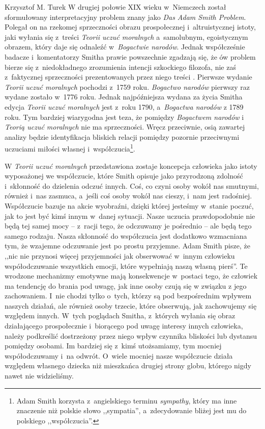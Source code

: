 \begin{artplenv}{Krzysztof M. Turek}
W drugiej połowie XIX wieku w~Niemczech został sformułowany interpretacyjny problem znany jako \textit{Das Adam Smith
Problem}. Polegał on na rzekomej sprzeczności obrazu prospołecznej i~altruistycznej istoty, jaki wyłania się z~treści
\textit{Teorii uczuć moralnych} a~samolubnym, egoistycznym obrazem, który daje się odnaleźć w~\textit{Bogactwie narodów}.
Jednak współcześnie badacze i~komentatorzy Smitha prawie powszechnie zgadzają się, że ów problem bierze
się z~niedokładnego zrozumienia intencji szkockiego filozofa, nie zaś z~faktycznej sprzeczności prezentowanych przez niego
treści
\parencite{wilson_adam_2006}.
Pierwsze wydanie \textit{Teorii uczuć moralnych} pochodzi z~1759
roku. \textit{Bogactwo narodów} pierwszy raz wydane zostało w~1776 roku. Jednak
najpóźniejsza wydana za życia Smitha edycja \textit{Teorii uczuć moralnych} jest z~roku 1790, a~\textit{Bogactwa narodów} z 1789 roku. Tym
bardziej wiarygodna jest teza, że pomiędzy \textit{Bogactwem narodów} i \textit{Teorią uczuć moralnych} nie ma sprzeczności. Wręcz przeciwnie,
osią zawartej analizy będzie identyfikacja bliskich relacji pomiędzy pozornie przeciwnymi uczuciami miłości
własnej i~współczucia\footnote{Adam Smith korzysta z~angielskiego terminu \textit{sympathy},
który ma inne znaczenie niż polskie
słowo ,,sympatia'', a~zdecydowanie bliżej jest mu do polskiego ,,współczucia''.}.

W \textit{Teorii uczuć moralnych} przedstawiona zostaje koncepcja człowieka jako istoty wyposażonej we współczucie,
które Smith opisuje jako przyrodzoną zdolność i~skłonność do dzielenia odczuć innych. Coś, co czyni osoby wokół nas
smutnymi, również i~nas zasmuca, a~jeśli coś osoby wokół nas cieszy, i~nam jest radośniej. Współczucie bazuje na akcie
wyobraźni, dzięki której jesteśmy w~stanie poczuć, jak to jest być kimś innym w~danej sytuacji. Nasze uczucia
prawdopodobnie nie będą tej samej mocy -- z~racji tego, że odczuwamy je pośrednio -- ale będą tego samego rodzaju. Nasza
skłonność do współczucia jest dodatkowo wzmacniana tym, że wzajemne odczuwanie jest po prostu przyjemne. Adam Smith
\parencite*[s.~9]{smith_theory_2005}
pisze, że ,,nic nie przynosi więcej przyjemności jak obserwować w~innym człowieku
współodczuwanie wszystkich emocji, które wypełniają naszą własną pierś''. Te wrodzone mechanizmy emotywne mają
konsekwencje w~postaci tego, że człowiek ma tendencję do brania pod uwagę, jak inne osoby czują się w związku z jego zachowaniem.
I~nie chodzi tylko o~tych, którzy są pod bezpośrednim wpływem naszych działań, ale również osoby trzecie,
które obserwują, jak zachowujemy się względem innych. W~tych poglądach Smitha, z~których wyłania się obraz działającego
prospołecznie i~biorącego pod uwagę interesy innych człowieka, należy podkreślić dostrzeżony przez niego wpływ czynnika
bliskości lub dystansu pomiędzy osobami. Im bardziej się z~kimś utożsamiamy, tym mocniej współodczuwamy i~na
odwrót. O~wiele mocniej nasze współczucie działa względem własnego dziecka niż mieszkańca drugiej strony globu, którego nigdy
nawet nie widzieliśmy.


\end{artplenv}
